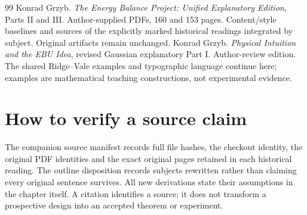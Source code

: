\begin{thebibliography}{99}
 Konrad Grzyb. \emph{The Energy Balance Project: Unified Explanatory Edition}, Parts II and III. Author-supplied PDFs, 160 and 153 pages. Content/style baselines and sources of the explicitly marked historical readings integrated by subject. Original artifacts remain unchanged.
 Konrad Grzyb. \emph{Physical Intuition and the EBU Idea}, revised Gaussian explanatory Part I. Author-review edition. The shared Ridge--Vale examples and typographic language continue here; examples are mathematical teaching constructions, not experimental evidence.
\end{thebibliography}
\section*{How to verify a source claim}
The companion source manifest records full file hashes, the checkout identity,
the original PDF identities and the exact original pages retained in each
historical reading. The outline disposition records subjects rewritten rather than
claiming every original sentence survives. All new derivations state their
assumptions in the chapter itself. A citation identifies a source; it does
not transform a prospective design into an accepted theorem or experiment.
